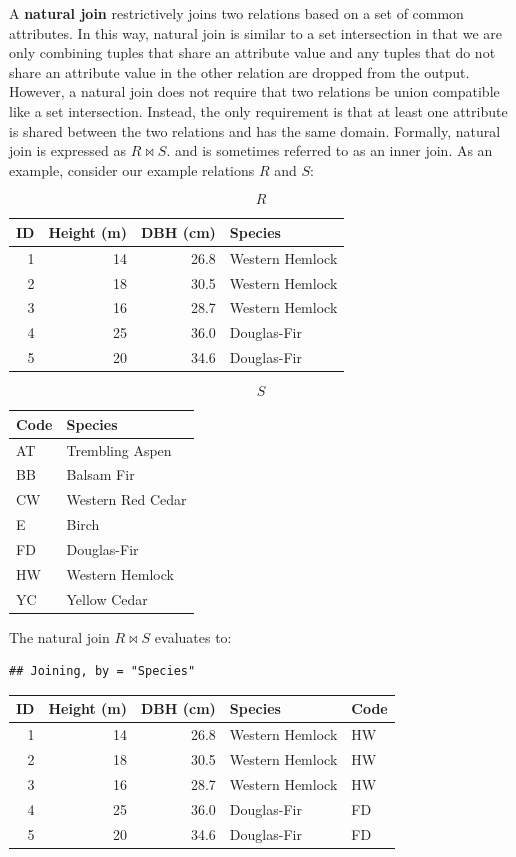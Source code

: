 \documentclass[
]{book}
\begin{document}
A \textbf{natural join} restrictively joins two relations based on a set of common attributes. In this way, natural join is similar to a set intersection in that we are only combining tuples that share an attribute value and any tuples that do not share an attribute value in the other relation are dropped from the output. However, a natural join does not require that two relations be union compatible like a set intersection. Instead, the only requirement is that at least one attribute is shared between the two relations and has the same domain. Formally, natural join is expressed as \(R⋈S\). and is sometimes referred to as an inner join. As an example, consider our example relations \(R\) and \(S\):

\[R\]

\begin{tabular}{rrrl}
\toprule
ID & Height (m) & DBH (cm) & Species\\
\midrule
1 & 14 & 26.8 & Western Hemlock\\
2 & 18 & 30.5 & Western Hemlock\\
3 & 16 & 28.7 & Western Hemlock\\
4 & 25 & 36.0 & Douglas-Fir\\
5 & 20 & 34.6 & Douglas-Fir\\
\bottomrule
\end{tabular}

\[S\]

\begin{tabular}{ll}
\toprule
Code & Species\\
\midrule
AT & Trembling Aspen\\
BB & Balsam Fir\\
CW & Western Red Cedar\\
E & Birch\\
FD & Douglas-Fir\\
\addlinespace
HW & Western Hemlock\\
YC & Yellow Cedar\\
\bottomrule
\end{tabular}

The natural join \(R⋈S\) evaluates to:

\begin{verbatim}
## Joining, by = "Species"
\end{verbatim}

\begin{tabular}{rrrll}
\toprule
ID & Height (m) & DBH (cm) & Species & Code\\
\midrule
1 & 14 & 26.8 & Western Hemlock & HW\\
2 & 18 & 30.5 & Western Hemlock & HW\\
3 & 16 & 28.7 & Western Hemlock & HW\\
4 & 25 & 36.0 & Douglas-Fir & FD\\
5 & 20 & 34.6 & Douglas-Fir & FD\\
\bottomrule
\end{tabular}
\end{document}
